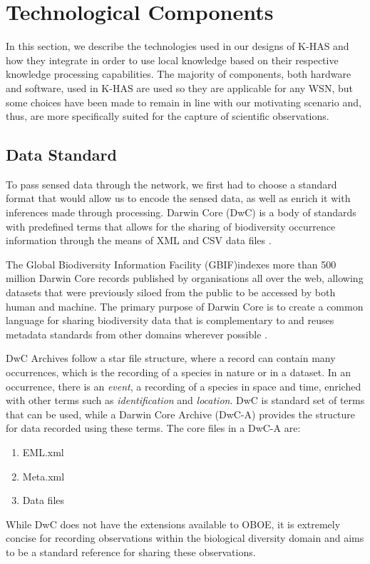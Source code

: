 	\DIFaddend \section{Technological Components}\label{arch:tech}
	In this section, we describe the technologies used in our designs of K-HAS and how they integrate in order to use local knowledge based on their respective knowledge processing capabilities. The majority of components, both hardware and software, used in K-HAS are used so they are applicable for any WSN, but some choices have been made to remain in line with our motivating scenario and, thus, are more specifically suited for the capture of scientific observations.

	\subsection{Data Standard}\label{arch:tech:dwc}
		To pass sensed data through the network, we first had to choose a standard format that would allow us to encode the sensed data, as well as enrich it with inferences made through processing. Darwin Core (DwC) is a body of standards with predefined terms that allows for the sharing of biodiversity occurrence information through the means of XML and CSV data files \cite{wieczorek2012}.

The Global Biodiversity Information Facility (GBIF)\DIFaddbegin {}\DIFaddend indexes more than 500 million Darwin Core records published by organisations all over the web, allowing datasets that were previously siloed from the public to be accessed by both human and machine. The primary purpose of Darwin Core is to create a common language for sharing biodiversity data that is complementary to and reuses metadata standards from other domains wherever possible \cite{wieczorek2012}.

DwC Archives follow a star file structure, where a record can contain many occurrences, which is the recording of a species in nature or in a dataset. In an occurrence, there is an \textit{event}, a recording of a species in space and time, enriched with other terms such as \textit{identification} and \textit{location}. DwC is \DIFdelbegin {}\DIFdelend \DIFaddbegin {}\DIFaddend standard set of terms that can be used, while a Darwin Core Archive (DwC-A) provides the structure for data recorded using these terms. The core files in a DwC-A are:
\begin{enumerate}
	\item EML.xml
	\item Meta.xml
	\item Data files
\end{enumerate}
While DwC does not have the extensions available to OBOE, \DIFaddbegin {}\DIFaddend it is extremely concise for recording observations within the biological diversity domain and aims to be a standard reference for sharing these observations.

